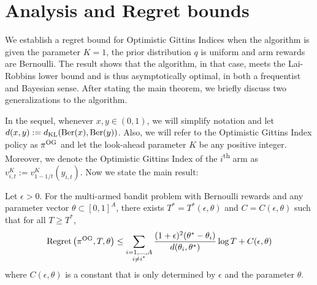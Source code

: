 \section{Analysis and Regret bounds} \label{sec:analysis_of_regret}
We establish a regret bound for Optimistic Gittins Indices when the algorithm is given the parameter $K = 1$, the prior distribution $q$ is uniform and arm rewards are Bernoulli. The result shows that the algorithm, in that case, meets the Lai-Robbins lower bound and is thus asymptotically optimal, in both a frequentist and Bayesian sense. After stating the main theorem, we briefly discuss two generalizations to the algorithm.

In the sequel, whenever $x,y \in (0,1)$, we will simplify notation  and let $d(x,y) := d_{\rm KL}(\text{Ber}(x),\text{Ber}(y))$. Also, we will refer to the Optimistic Gittins Index policy as $\pi^{\rm OG}$ and let the look-ahead parameter $K$ be any positive integer. Moreover, we denote the Optimistic Gittins Index of the $i$\textsuperscript{th} arm as $v^K_{i,t} := v^K_{1-1/t}(y_{i,t})$. Now we state the main result:
\begin{theorem} \label{thm:frequentist_optimal_bound}
	Let $\epsilon > 0$. For the multi-armed bandit problem with Bernoulli rewards and any parameter vector $\theta \subset [0,1]^A$, there exists $T^* = T^*(\epsilon, \theta)$ and $C = C(\epsilon,\theta)$ such that for all $T \ge T^*$,
	\begin{equation}
	\textnormal{Regret} \left( \pi^{\rm OG}, T, \theta \right) \le \sum_{\substack{i=1,\ldots,A \\ i \ne i^*}} \frac{(1+\epsilon)^2(\theta^* - \theta_i)}{d(\theta_i, \theta^*)} \log T  + C(\epsilon,\theta)
	\end{equation}
	where $C(\epsilon,\theta)$ is a constant that is only determined by $\epsilon$ and the parameter $\theta$.
\end{theorem}
